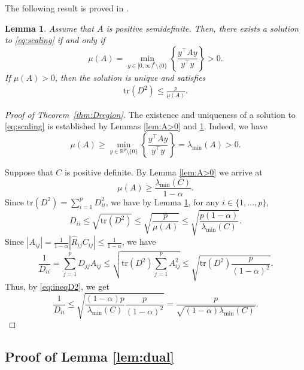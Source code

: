\documentclass[12pt]{amsart}
\numberwithin{equation}{section}
\numberwithin{equation}{section}
\theoremstyle{plain}
\newtheorem{lemma}{Lemma}
\theoremstyle{definition}
\newcommand{\tr}{\mathrm{tr}}
\newcommand{\R}{\mathbb{R}}
\begin{document}
The following result is proved in \cite{Kal92}.
\begin{lemma}\label{lem:D}
Assume that $A$ is positive semidefinite. Then, there exists a solution to \eqref{eq:scaling} if and only if 
\[
\mu(A) = \min_{y\in[0,\infty)^p\setminus\{0\}} \left\{ \frac{y^\top  A y}{y^\top y} \right\} > 0.  
\]
If $\mu(A)>0$, then the solution is unique and satisfies
\begin{align}\label{eq:ineqD2}
\tr(D^2) \leq \frac{p}{\mu(A)}.
\end{align}
\end{lemma}

\begin{proof}[Proof of Theorem~\ref{thm:Dregion}]
The existence and uniqueness of a solution to \eqref{eq:scaling} is established by Lemmas \ref{lem:A>0} and \ref{lem:D}. Indeed, we have
\[
\mu(A) \geq \min_{y\in \R^p\setminus\{0\}} \left\{ \frac{y^\top A y}{y^\top y}\right\} = \lambda_{\min}(A) > 0. 
\]

Suppose that $C$ is positive definite. 
By Lemma \ref{lem:A>0} we arrive at
\[
\mu(A) \geq \frac{\lambda_{\min}(C)}{1-\alpha}. 
\]
Since $\tr(D^2) = \sum_{i=1}^p D_{ii}^2$, we have by Lemma \ref{lem:D}, for any $i\in\{1,\ldots,p\}$,
\[
D_{ii}\leq \sqrt{\tr(D^2)} \leq \sqrt{\frac{p}{\mu(A)}} \leq \sqrt{\frac{p (1-\alpha)}{\lambda_{\min}(C)}}.
\]
Since $|A_{ij}| = \frac{1}{1-\alpha}|\hat{R}_{ij}C_{ij}|\leq \frac{1}{1-\alpha}$, we have
\[
\frac{1}{D_{ii}} = \sum_{j=1}^p D_{jj} A_{ij} \leq \sqrt{\tr(D^2) \sum_{j=1}^p A_{ij}^2} 
\leq \sqrt{\tr(D^2) \frac{p}{(1-\alpha)^2}}. 
\]
Thus, by \eqref{eq:ineqD2}, we get 
\[
\frac{1}{D_{ii}} \leq \sqrt{\frac{(1-\alpha)p}{\lambda_{\min}(C)} \frac{p}{(1-\alpha)^2}} = \frac{p}{\sqrt{(1-\alpha)\lambda_{\min}(C)}}. 
\]
\end{proof}

\subsection{Proof of Lemma \ref{lem:dual}}
\end{document}

